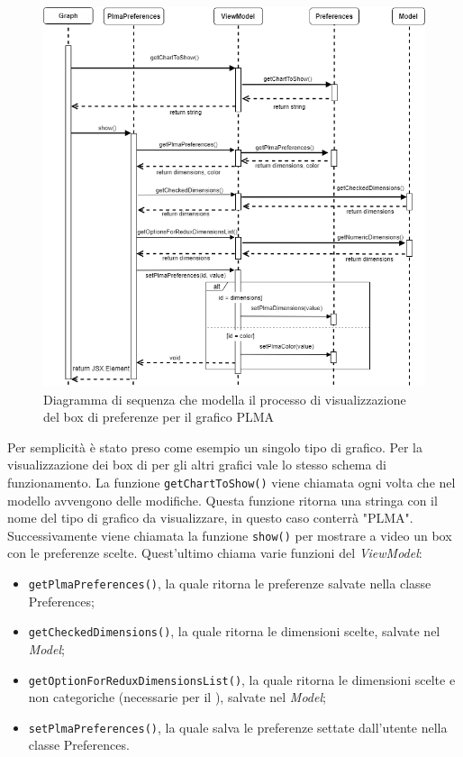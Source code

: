 \begin{figure}[hb]
\includegraphics[width=14cm]{Images/Allegato Tecnico-Sequenza-PLMApref}
\centering
\caption{Diagramma di sequenza che modella il processo di visualizzazione del box di preferenze per il grafico PLMA}
\end{figure}
Per semplicità è stato preso come esempio un singolo tipo di grafico. Per la visualizzazione dei box di  per gli altri grafici vale lo stesso schema di funzionamento.
La funzione \texttt{getChartToShow()} viene chiamata ogni volta che nel modello avvengono delle modifiche. Questa funzione ritorna una stringa con il nome del tipo di grafico da visualizzare, in questo caso conterrà "PLMA".
Successivamente viene chiamata la funzione \texttt{show()} per mostrare a video un box con le preferenze scelte. Quest'ultimo chiama varie funzioni del \textit{ViewModel}:
\begin{itemize}
\item \texttt{getPlmaPreferences()}, la quale ritorna le preferenze salvate nella classe Preferences;
\item \texttt{getCheckedDimensions()}, la quale ritorna le dimensioni scelte, salvate nel \textit{Model};
\item \texttt{getOptionForReduxDimensionsList()}, la quale ritorna le dimensioni scelte e non categoriche (necessarie per il ), salvate nel \textit{Model};
\item \texttt{setPlmaPreferences()}, la quale salva le preferenze settate dall'utente nella classe Preferences.
\end{itemize}
